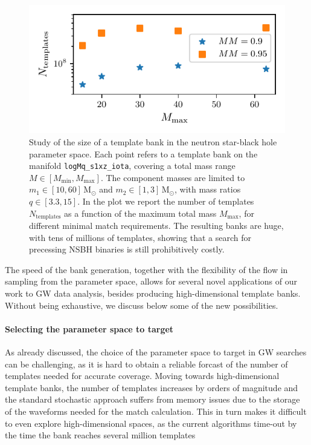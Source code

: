\documentclass[twocolumn,showpacs,preprintnumbers,nofootinbib,prd,
superscriptaddress,10pt]{revtex4-2}
\begin{document}
\begin{figure}[t]
	\centering
	\includegraphics[scale = 1.]{NSBH_size}
	\caption{Study of the size of a template bank in the neutron star-black hole parameter space. Each point refers to a template bank on the manifold \texttt{logMq\_s1xz\_iota}, covering a total mass range $M\in[M_\text{min}, M_\text{max}]$. The component masses are limited to $m_1 \in [10, 60]\,\mathrm{M_\odot}$ and  $m_2 \in [1, 3]\,\mathrm{M_\odot}$, with mass ratios $q \in [3.3, 15]$. In the plot we report the number of templates $N_\text{templates}$ as a function of the maximum total mass $M_\text{max}$, for different minimal match requirements. The resulting banks are huge, with tens of millions of templates, showing that a search for precessing NSBH binaries is still prohibitively costly.}
	\label{fig:NSBH_size}
\end{figure}

The speed of the bank generation, together with the flexibility of the flow in sampling from the parameter space, allows for several novel applications of our work to GW data analysis, besides producing high-dimensional template banks.
Without being exhaustive, we discuss below some of the new possibilities.


\paragraph{Selecting the parameter space to target}\label{par:parameter_space_selection}
As already discussed, the choice of the parameter space to target in GW searches can be challenging, as it is hard to obtain a reliable forcast of the number of templates needed for accurate coverage.
Moving towards high-dimensional template banks, the number of templates increases by orders of magnitude and the standard stochastic approach suffers from memory issues due to the storage of the waveforms needed for the match calculation.
This in turn makes it difficult to even explore high-dimensional spaces, as the current algorithms time-out by the time the bank reaches several million templates
\end{document}

